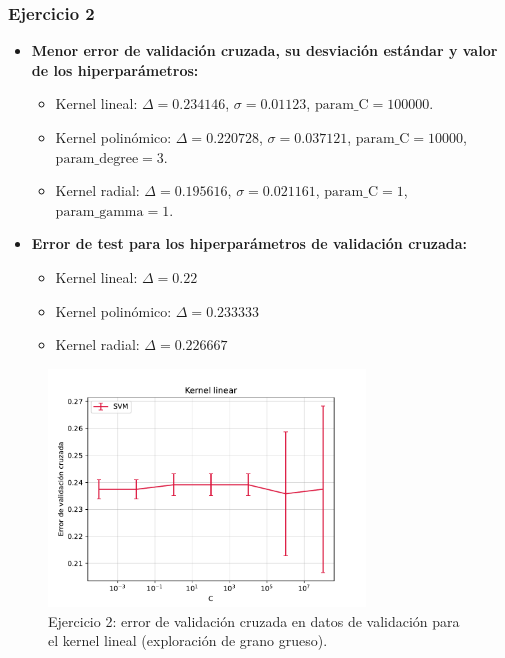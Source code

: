 \documentclass[11pt]{article}
\begin{document}
\subsubsection*{Ejercicio 2}

\begin{itemize}
    \item \textbf{Menor error de validación cruzada, su desviación estándar y valor de los hiperparámetros:} 
    \begin{itemize}
    \item Kernel lineal: $\Delta = 0.234146$, $\sigma = 0.01123$, $\text{param\_C} = 100000$.
    \item Kernel polinómico: $\Delta = 0.220728$, $\sigma = 0.037121$, $\text{param\_C} = 10000$, $\text{param\_degree} = 3$.
    \item Kernel radial: $\Delta = 0.195616$, $\sigma = 0.021161$, $\text{param\_C} = 1$, $\text{param\_gamma} = 1$.
    \end{itemize}
    \item \textbf{Error de test para los hiperparámetros de validación cruzada:} 
    \begin{itemize}
    \item Kernel lineal: $\Delta = 0.22$
    \item Kernel polinómico: $\Delta = 0.233333$
    \item Kernel radial: $\Delta = 0.226667$
    \end{itemize}
\end{itemize}


\begin{figure}[h]
\centering
\includegraphics[width=0.75\textwidth]{fotos/lineal_gg.pdf}
\caption{Ejercicio 2: error de validación cruzada en datos de validación para el kernel lineal (exploración de grano grueso).}
\end{figure}
\end{document}
